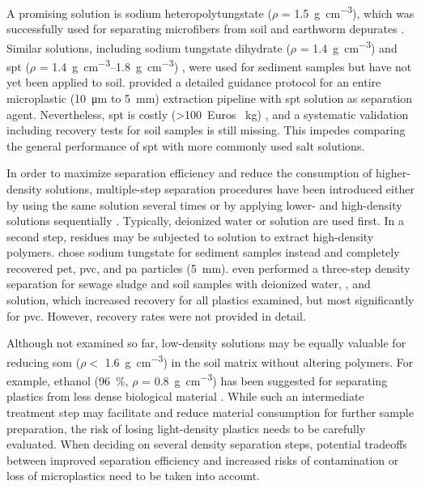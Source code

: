 A promising solution is sodium heteropolytungstate ($\rho$ = \SI{1.5}{\gram\per\cubic\centi\meter}), which was successfully used for separating microfibers from soil and earthworm depurates \citep{Prendergast-MillerPolyesterderived2019}. Similar solutions, including sodium tungstate dihydrate ($\rho$ = \SI{1.4}{\gram\per\cubic\centi\meter}) \citep{FriasStandardised2018} and \ac{spt} ($\rho$ = \SIrange{1.4}{1.8}{\gram\per\cubic\centi\meter}) \citep{BallentSources2016,EndersTracing2019,EndersWhen2020,CorcoranPlastics2009}, were used for sediment samples but have not yet been applied to soil.
 provided a detailed guidance protocol for an entire microplastic (\SI{10}{\micro\meter} to \SI{5}{\milli\meter}) extraction pipeline with \ac{spt} solution as separation agent. Nevertheless, \ac{spt} is costly (\num{>100}~Euros \si{\per\kilo\gram}) \citep{CampanalePractical2020}, and a systematic validation including recovery tests for soil samples is still missing. This impedes comparing the general performance of \ac{spt} with more commonly used salt solutions.

In order to maximize separation efficiency and reduce the consumption of higher-density solutions, multiple-step separation procedures have been introduced either by using the same solution several times \citep{LiuMicroplastic2018,HuangAgricultural2020} or by applying lower- and high-density solutions sequentially \citep{NuelleNew2014,HurleyValidation2018,CorradiniEvidence2019,vandenBergSewage2020,DekiffOccurrence2014,ZhouDistribution2018}. Typically, deionized water \citep{vandenBergSewage2020,HurleyValidation2018} or  solution \citep{NuelleNew2014,DekiffOccurrence2014,ZhouDistribution2018,FrereInfluence2017} are used first.
In a second step, residues may be subjected to  solution to extract high-density polymers.  chose sodium tungstate for sediment samples instead and completely recovered \ac{pet}, \ac{pvc}, and \ac{pa} particles (\SI{5}{\milli\meter}).  even performed a three-step density separation for sewage sludge and soil samples with deionized water, , and  solution, which increased recovery for all plastics examined, but most significantly for \ac{pvc}. However, recovery rates were not provided in detail.

Although not examined so far, low-density solutions may be equally valuable for reducing \ac{som} ($\rho <$ \SI{1.6}{\gram\per\cubic\centi\meter}) \citep{CerliSeparation2012} in the soil matrix without altering polymers. For example, ethanol (\SI{96}{\percent}, $\rho$ = \SI{0.8}{\gram\per\cubic\centi\meter}) has been suggested for separating plastics from less dense biological material \citep{HerreraNovel2018}. While such an intermediate treatment step may facilitate and reduce material consumption for further sample preparation, the risk of losing light-density plastics needs to be carefully evaluated. When deciding on several density separation steps, potential tradeoffs between improved separation efficiency and increased risks of contamination or loss of microplastics need to be taken into account.

